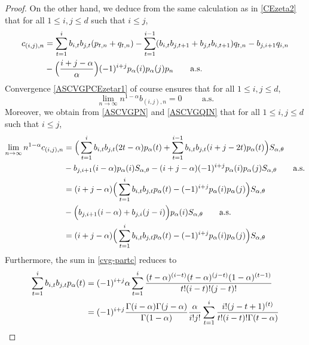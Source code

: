 \documentclass[twoside,12pt]{article}
\begin{document}
\begin{proof}
On the other hand, we deduce from the same calculation as in \eqref{CEzeta2} that for all $1\leq i,j \leq d$ such that $i \leq j$,
\begin{align}\label{equation_partc}
 c_{(i,j),n}&=\sum_{t=1}^{i}b_{i,t}b_{j,t} (p_{t,n}+q_{t,n})
- \sum_{t=1}^{i-1}(b_{i,t}b_{j,t+1}+b_{j,t}b_{i,t+1})q_{t,n}  -b_{j,i+1}q_{i,n}\\
&\notag - \Bigl(\frac{i+j-\alpha}{\alpha}\Bigr) (-1)^{i+j} p_{\alpha}(i)p_{\alpha}(j)p_n \qquad \text{a.s.}
\end{align}
Convergence \eqref{ASCVGPCEzetar1} of course ensures that for all $1\leq i,j \leq d$,
\begin{equation}
\label{cvg-partb}
\lim_{n \rightarrow \infty} n^{1-\alpha} b_{(i,j),n} = 0 \hspace{1cm} \text{a.s.}
\end{equation}
Moreover, we obtain from \eqref{ASCVGPN} and \eqref{ASCVGQIN} that for all $1\leq i,j \leq d$ such that $i \leq j$,
\begin{align}\label{cvg-partc}
\lim_{n \rightarrow \infty} n^{1-\alpha} c_{(i,j),n}
&= \Big( \sum_{t=1}^{i}b_{i,t} b_{j,t} (2t - \alpha) p_{\alpha}(t) 
+  \sum_{t=1}^{i-1}b_{i,t} b_{j,t} (i+j -2t) p_{\alpha}(t) \Big)S_{\alpha, \theta} \notag \\
&\notag -b_{j,i+1}(i-\alpha)p_{\alpha}(i)S_{\alpha,\theta} - (i+j-\alpha) (-1)^{i+j} p_{\alpha}(i)p_{\alpha}(j) S_{\alpha, \theta} 
\qquad \text{a.s.} \notag \\  
&\notag=(i+j- \alpha) \Big( \sum_{t=1}^{i}b_{i,t} b_{j,t}  p_{\alpha}(t) - (-1)^{i+j} p_{\alpha}(i)p_{\alpha}(j) \Big)S_{\alpha, \theta} \\ 
&\notag - \Big( b_{j,i+1}(i-\alpha)+b_{j,i}(j-i) \Big) p_\alpha(i) S_{\alpha, \theta}   \qquad \text{a.s.}\notag\\
&=(i+j- \alpha) \Big( \sum_{t=1}^{i}b_{i,t} b_{j,t}  p_{\alpha}(t) - (-1)^{i+j} p_{\alpha}(i)p_{\alpha}(j) \Big)S_{\alpha, \theta}
\end{align}
Furthermore, the sum in \eqref{cvg-partc} reduces to
\begin{align}\label{final0}
\notag\sum_{t=1}^{i}b_{i,t} b_{j,t}  p_{\alpha}(t)&=(-1)^{i+j}\alpha\sum_{t=1}^{i}\frac{(t-\alpha)^{(i-t)}(t-\alpha)^{(j-t)}(1-\alpha)^{(t-1)}}{t!(i-t)!(j-t)!}\\
&\notag=(-1)^{i+j}\frac{\Gamma(i-\alpha)\Gamma(j-\alpha)}{\Gamma(1-\alpha)}\frac{\alpha}{i!j!}\sum_{t=1}^{i}\frac{i!(j-t+1)^{(t)}}{t!(i-t)!\Gamma(t-\alpha)}\\

\end{align}
\end{proof}
\end{document}
